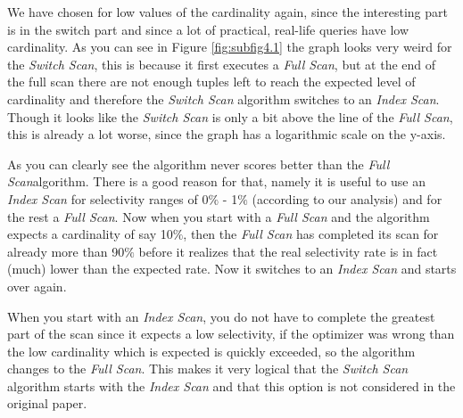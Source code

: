 \documentclass[a4paper,11pt,twoside]{article}
\begin{document}
We have chosen for low values of the cardinality again, since the interesting part is in the switch part and since a lot of practical, real-life queries have low cardinality. As you can see in Figure \autoref{fig:subfig4.1} the graph looks very weird for the \textit{Switch Scan}, this is because it first executes a \textit{Full Scan}, but at the end of the full scan there are not enough tuples left to reach the expected level of cardinality and therefore the \textit{Switch Scan} algorithm switches to an \textit{Index Scan}. Though it looks like the \textit{Switch Scan} is only a bit above the line of the \textit{Full Scan}, this is already a lot worse, since the graph has a logarithmic scale on the y-axis.

As you can clearly see the algorithm never scores better than the \textit{Full Scan}algorithm. There is a good reason for that, namely it is useful to use an \textit{Index Scan} for selectivity ranges of 0$\%$ - 1$\%$ (according to our analysis) and for the rest a \textit{Full Scan}. Now when you start with a \textit{Full Scan} and the algorithm expects a cardinality of say 10$\%$, then the \textit{Full Scan} has completed its scan for already more than 90$\%$ before it realizes that the real selectivity rate is in fact (much) lower than the expected rate. Now it switches to an \textit{Index Scan} and starts over again.

When you start with an \textit{Index Scan}, you do not have to complete the greatest part of the scan since it expects a low selectivity, if the optimizer was wrong than the low cardinality which is expected is quickly exceeded, so the algorithm changes to the \textit{Full Scan}. This makes it very logical that the \textit{Switch Scan} algorithm starts with the \textit{Index Scan} and that this option is not considered in the original paper.
\end{document}
